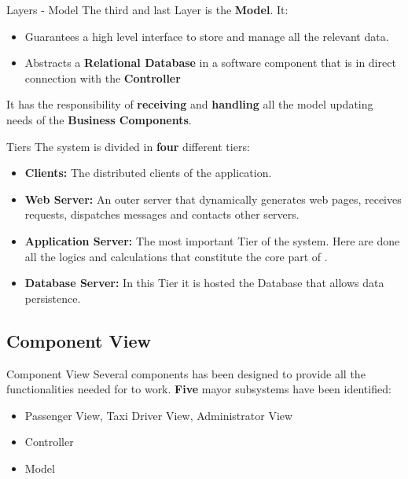 \documentclass{../common/latex_classes/pdf_presentation}
\begin{document}
	\begin{frame}{Layers - Model}
		The third and last Layer is the \textbf{Model}. It:
		\begin{itemize}
			\item Guarantees a high level interface to store and manage all the \myTaxiService{} relevant data.
			\item Abstracts a \textbf{Relational Database} in a software component that is in direct connection with the \textbf{Controller}
		\end{itemize}
		
		It has the responsibility of \textbf{receiving} and \textbf{handling} all the model updating needs of the \textbf{Business Components}. 
	\end{frame}
	
	\begin{frame}{Tiers}
		The system is divided in \textbf{four} different tiers:
		\begin{itemize}
			\item \textbf{Clients:} The distributed clients of the application.
			\item \textbf{Web Server:} An outer server that dynamically generates web pages, receives requests, dispatches messages and contacts other servers.
			\item \textbf{Application Server:} The most important Tier of the system. Here are done all the logics and calculations that constitute the core part of \myTaxiService{}.
			\item \textbf{Database Server:} In this Tier it is hosted the Database that allows data persistence.
		\end{itemize}
	\end{frame}
	
	\subsection{Component View}
	
	\begin{frame}{Component View}
		Several components has been designed to provide all the functionalities needed for \myTaxiService{} to work.
		\textbf{Five} mayor subsystems have been identified:
		\begin{itemize}
			\item Passenger View, Taxi Driver View, Administrator View
			\item Controller
			\item Model
		\end{itemize}
	\end{frame}
	
\end{document}

